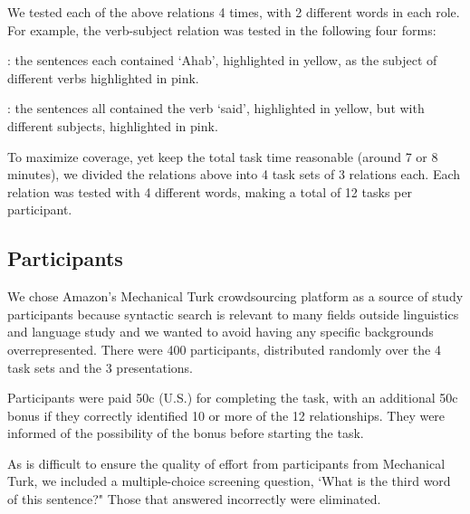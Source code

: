 We tested each of the above relations 4 times, with 2 different words in each role. For example, the verb-subject relation  was tested in the following four forms:
\squishlist
	\item {}:  the sentences each contained `Ahab', highlighted in yellow, as the subject of different verbs highlighted in pink.
	\item {}

	\item {}: the sentences all contained the verb `said', highlighted in yellow, but with different subjects, highlighted in pink.
	\item {}
\squishend

To maximize coverage, yet keep the total task time reasonable (around 7 or 8 minutes), we divided the relations above into 4 task sets of 3 relations each. Each relation was tested with 4 different words, making a total of 12 tasks per participant.

\subsection{Participants}
We chose Amazon's Mechanical Turk crowdsourcing platform as a source of study participants because syntactic search is relevant to many fields outside linguistics and language study and we wanted to avoid having any specific backgrounds overrepresented. There were 400 participants, distributed randomly over the 4 task sets and the 3 presentations.

Participants were paid 50c (U.S.) for completing the task, with an additional 50c bonus if they correctly identified 10 or more of the 12 relationships. They were informed of the possibility of the bonus before starting the task.

As is difficult to ensure the quality of effort from participants from Mechanical Turk, we included a multiple-choice screening question, `What is the third word of this sentence?"  Those that answered incorrectly were eliminated.


